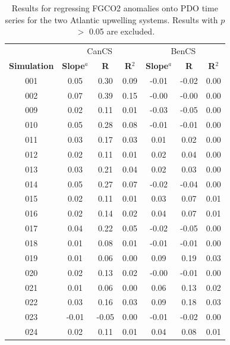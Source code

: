 \documentclass[12pt]{article}
\begin{document}
\newpage
\begin{table}[!h]
	\centering
	\caption{Results for regressing FGCO2 anomalies onto PDO time series for the two Atlantic upwelling systems. Results with $p$ $>$ 0.05 are excluded.}
	\begin{tabular}{c c c c | c c c}
		& \multicolumn{3}{c}{CanCS} & \multicolumn{3}{c}{BenCS} \\
		\cmidrule{2-4}\cmidrule{5-7}
		\textbf{Simulation} &  \textbf{Slope}$^{a}$  &  \textbf{R} &  \textbf{R$^{2}$} &  \textbf{Slope}$^{a}$  &  \textbf{R} &  \textbf{R$^{2}$}  \\
		\midrule
		001 &   0.05 &     0.30 &       0.09 &  -0.01 &    -0.02 &       0.00 \\
		002 &   0.07 &     0.39 &       0.15 &  -0.00 &    -0.00 &       0.00 \\
		009 &   0.02 &     0.11 &       0.01 &  -0.03 &    -0.05 &       0.00 \\
		010 &   0.05 &     0.28 &       0.08 &  -0.01 &    -0.01 &       0.00 \\
		011 &   0.03 &     0.17 &       0.03 &   0.01 &     0.02 &       0.00 \\
		012 &   0.02 &     0.11 &       0.01 &   0.02 &     0.04 &       0.00 \\
		013 &   0.03 &     0.21 &       0.04 &   0.02 &     0.03 &       0.00 \\
		014 &   0.05 &     0.27 &       0.07 &  -0.02 &    -0.04 &       0.00 \\
		015 &   0.02 &     0.11 &       0.01 &   0.03 &     0.07 &       0.01 \\
		016 &   0.02 &     0.14 &       0.02 &   0.04 &     0.07 &       0.01 \\
		017 &   0.04 &     0.22 &       0.05 &  -0.02 &    -0.05 &       0.00 \\
		018 &   0.01 &     0.08 &       0.01 &  -0.01 &    -0.01 &       0.00 \\
		019 &   0.01 &     0.06 &       0.00 &   0.09 &     0.19 &       0.03 \\
		020 &   0.02 &     0.13 &       0.02 &  -0.00 &    -0.01 &       0.00 \\
		021 &   0.01 &     0.06 &       0.00 &   0.06 &     0.13 &       0.02 \\
		022 &   0.03 &     0.16 &       0.03 &   0.09 &     0.18 &       0.03 \\
		023 &  -0.01 &    -0.05 &       0.00 &  -0.01 &    -0.02 &       0.00 \\
		024 &   0.02 &     0.11 &       0.01 &   0.04 &     0.08 &       0.01 \\

\end{tabular}
\end{table}
\end{document}
